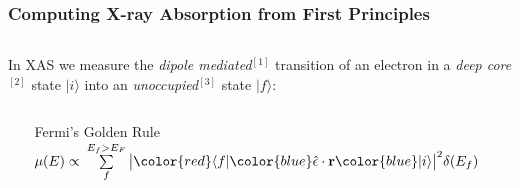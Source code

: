 \documentclass[10pt, xcolor=x11names, compress]{beamer}
\begin{document}


\begin{frame}
  \frametitle{Computing X-ray Absorption from First Principles}
  \begin{columns}
    \begin{column}{0.75\linewidth}
      In XAS we measure the \emph{dipole mediated}$^\mathrm{[1]}$
      transition of an electron in a \emph{deep core}$^\mathrm{[2]}$
      state {\color{blue}$|i\rangle$} into an
      \emph{unoccupied}$^\mathrm{[3]}$ state {\color{red}$|f\rangle$}:

      \begin{columns}
        \begin{column}{0.15\linewidth}
          ~
        \end{column}
        \begin{column}{0.7\linewidth}
          \begin{block}{Fermi's Golden Rule}
            $\mu(E) \propto\> \sum\limits_f^{E_f>E_F}
            \big|{\color{red}\langle f|}
            {\color{blue}\hat{\epsilon}\cdot\mathbf{r}}
            {\color{blue}|i\rangle}\big|^2 \delta(E_f)$
          \end{block}
        \end{column}
        \begin{column}{0.15\linewidth}
          ~
        \end{column}
      \end{columns}

      \medskip


\end{column}
\end{columns}
\end{frame}
\end{document}
